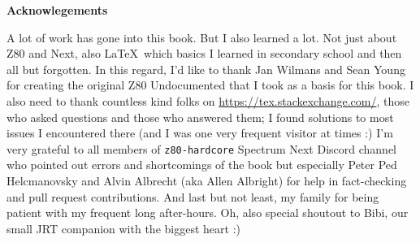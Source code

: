 \begingroup

	\textbf{Acknowlegements}

	A lot of work has gone into this book. But I also learned a lot. Not just about Z80 and Next, also \LaTeX~which basics I learned in secondary school and then all but forgotten. In this regard, I'd like to thank Jan Wilmans and Sean Young for creating the original Z80 Undocumented that I took as a basis for this book. I also need to thank countless kind folks on \url{https://tex.stackexchange.com/}, those who asked questions and those who answered them; I found solutions to most issues I encountered there (and I was one very frequent visitor at times :) I'm very grateful to all members of {\tt z80-hardcore} Spectrum Next Discord channel who pointed out errors and shortcomings of the book but especially Peter Ped Helcmanovsky and Alvin Albrecht (aka Allen Albright) for help in fact-checking and pull request contributions. And last but not least, my family for being patient with my frequent long after-hours. Oh, also special shoutout to Bibi, our small JRT companion with the biggest heart :)

	\WorkInProgressFullScreen

\endgroup
